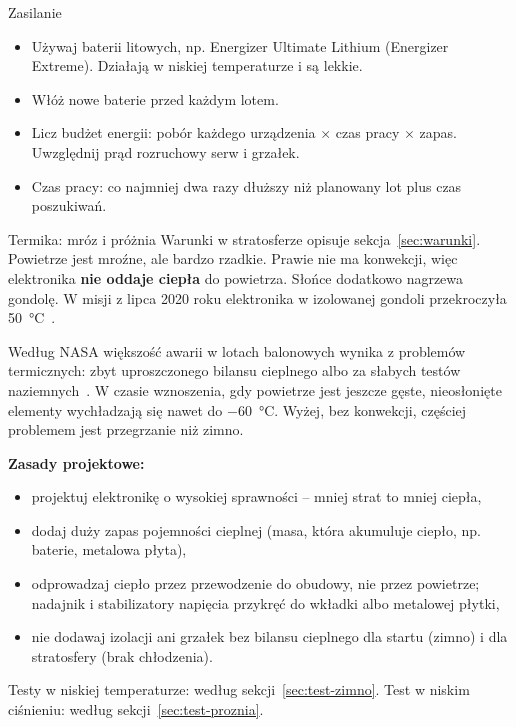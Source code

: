 \begin{sekcja}{Zasilanie}
\begin{itemize}
  \item Używaj baterii litowych, np. Energizer Ultimate Lithium (Energizer Extreme). Działają w niskiej temperaturze i są lekkie.
  \item Włóż nowe baterie przed każdym lotem.
  \item Licz budżet energii: pobór każdego urządzenia $\times$ czas pracy $\times$ zapas. Uwzględnij prąd rozruchowy serw i grzałek.
  \item Czas pracy: co najmniej dwa razy dłuższy niż planowany lot plus czas poszukiwań.
\end{itemize}
\end{sekcja}

\begin{sekcja}{Termika: mróz i próżnia}
Warunki w stratosferze opisuje sekcja~\ref{sec:warunki}. Powietrze jest mroźne, ale bardzo rzadkie. Prawie nie ma konwekcji, więc elektronika \textbf{nie oddaje ciepła} do powietrza. Słońce dodatkowo nagrzewa gondolę. W misji z lipca 2020 roku elektronika w izolowanej gondoli przekroczyła \SI{50}{\degreeCelsius}~\cite{praca2022}.

Według NASA większość awarii w lotach balonowych wynika z problemów termicznych: zbyt uproszczonego bilansu cieplnego albo za słabych testów naziemnych~\cite[rozdz.~12]{nasahb}. W czasie wznoszenia, gdy powietrze jest jeszcze gęste, nieosłonięte elementy wychładzają się nawet do \SI{-60}{\degreeCelsius}. Wyżej, bez konwekcji, częściej problemem jest przegrzanie niż zimno.

\textbf{Zasady projektowe:}
\begin{itemize}
  \item projektuj elektronikę o wysokiej sprawności -- mniej strat to mniej ciepła,
  \item dodaj duży zapas pojemności cieplnej (masa, która akumuluje ciepło, np. baterie, metalowa płyta),
  \item odprowadzaj ciepło przez przewodzenie do obudowy, nie przez powietrze; nadajnik i stabilizatory napięcia przykręć do wkładki albo metalowej płytki,
  \item nie dodawaj izolacji ani grzałek bez bilansu cieplnego dla startu (zimno) i dla stratosfery (brak chłodzenia).
\end{itemize}

Testy w niskiej temperaturze: według sekcji~\ref{sec:test-zimno}. Test w niskim ciśnieniu: według sekcji~\ref{sec:test-proznia}.
\end{sekcja}
